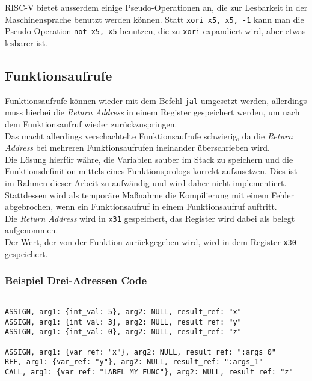 RISC-V bietet ausserdem einige Pseudo-Operationen an, die zur Lesbarkeit in der Maschinensprache benutzt werden können.
Statt \texttt{xori x5, x5, -1} kann man die Pseudo-Operation \texttt{not x5, x5} benutzen, die zu \texttt{xori} expandiert wird, aber etwas lesbarer ist.\\


\subsection{Funktionsaufrufe}

Funktionsaufrufe können wieder mit dem Befehl \texttt{jal} umgesetzt werden, allerdings muss hierbei die \textit{Return Address} in einem Register gespeichert werden, um nach dem Funktionsaufruf wieder zurückzuspringen.\\
Das macht allerdings verschachtelte Funktionsaufrufe schwierig, da die \textit{Return Address} bei mehreren Funktionsaufrufen ineinander überschrieben wird.\\
Die Lösung hierfür währe, die Variablen sauber im Stack zu speichern und die Funktionsdefinition mittels eines Funktionsprologs korrekt aufzusetzen.
Dies ist im Rahmen dieser Arbeit zu aufwändig und wird daher nicht implementiert.\\
Stattdessen wird als temporäre Maßnahme die Kompilierung mit einem Fehler abgebrochen, wenn ein Funktionsaufruf in einem Funktionsaufruf auftritt.\\
Die \textit{Return Address} wird in \texttt{x31} gespeichert, das Register wird dabei als belegt aufgenommen.\\
Der Wert, der von der Funktion zurückgegeben wird, wird in dem Register \texttt{x30} gespeichert.\\

\subsubsection{Beispiel Drei-Adressen Code}

\begin{lstlisting}[caption={Drei-Adressen Code Funktionsaufruf}]

ASSIGN, arg1: {int_val: 5}, arg2: NULL, result_ref: "x"
ASSIGN, arg1: {int_val: 3}, arg2: NULL, result_ref: "y"
ASSIGN, arg1: {int_val: 0}, arg2: NULL, result_ref: "z"

ASSIGN, arg1: {var_ref: "x"}, arg2: NULL, result_ref: ":args_0"
REF, arg1: {var_ref: "y"}, arg2: NULL, result_ref: ":args_1"
CALL, arg1: {var_ref: "LABEL_MY_FUNC"}, arg2: NULL, result_ref: "z"

\end{lstlisting}

